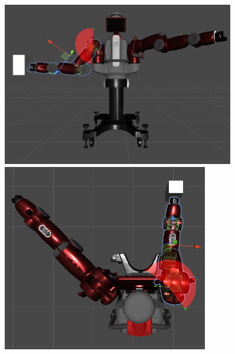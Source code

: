 \begin{figure}[htb]
    \hfill
    \centering
   \begin{minipage}{0.33\textwidth}
    \centering
    \includegraphics[width=0.9\textwidth]{imagenes/Baxter_Grabbing/FrontViewGrabbing.png}     
    \caption{}\label{Fig:x_axis_baxter}
   \end{minipage}\hfill
   \begin{minipage}{0.33\textwidth}
    \centering
    \includegraphics[width=0.8\textwidth]{imagenes/Baxter_Grabbing/TopViewGrabbing.png}     
    \caption{}\label{Fig:y_axis_baxter}
   \end{minipage}\hfill
   \begin{minipage}{0.34\textwidth}
    \centering

\end{minipage}
\end{figure}
